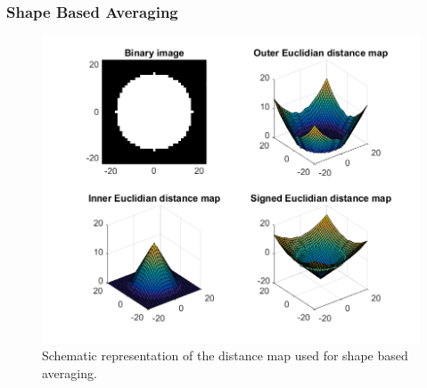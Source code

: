 \subsubsection*{Shape Based Averaging}

\begin{figure}[h!]
	\centering
	\includegraphics[width=0.8\linewidth]{img/distMap}
	\caption{Schematic representation of the distance map used for shape based averaging.}
	\label{fig:distMap}
\end{figure}
